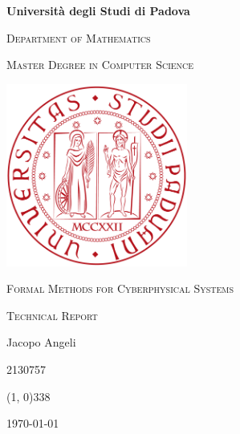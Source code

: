 \begin{titlepage}
    \centering
    \vspace*{1cm}

    {\LARGE\textbf{Università degli Studi di Padova} \par}
    \vspace{0.5cm}
    {\Large\textsc{Department of Mathematics} \par}
    \vspace{0.3cm}
    {\large\textsc{Master Degree in Computer Science} \par}

    \vfill

    \includegraphics[height=6cm]{media/logo-unipd.png}

    \vfill

    {\LARGE\textsc{Formal Methods for Cyberphysical Systems} \par}
    \vspace{0.5cm}
    {\large\textsc{Technical Report} \par}

    \vfill

    \begin{flushright}
        {\large Jacopo Angeli \par}
        {\large 2130757 \par}
        \vspace{0.5cm}
        \line(1, 0){338} \\
        \vspace{0.2cm}
        {\normalsize \textsc{\today} \par}
    \end{flushright}

\end{titlepage}
